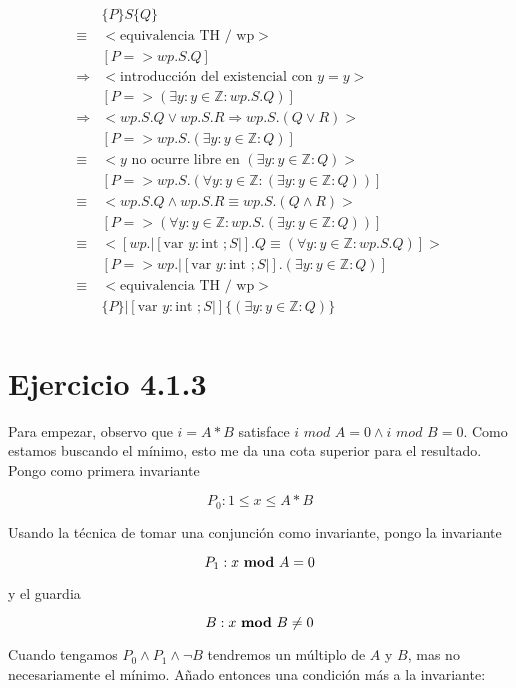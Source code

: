 \documentclass{article}
\begin{document}
\begin{align*}
 & \{P\} S \{Q\} \\
 \equiv & <\text{equivalencia TH / wp}> \\
 & [P => wp.S.Q] \\
 \Rightarrow & <\text{introducción del existencial con } y=y> \\
 & [P => (\exists y : y \in \mathbb{Z} : wp.S.Q)] \\
 \Rightarrow & <wp.S.Q \vee wp.S.R \Rightarrow wp.S.(Q \vee R)> \\
 & [P => wp.S.(\exists y : y \in \mathbb{Z} : Q)] \\
 \equiv & <y \text{ no ocurre libre en } (\exists y : y \in \mathbb{Z} : Q)> \\
 & [P => wp.S.(\forall y : y \in \mathbb{Z} : (\exists y : y \in \mathbb{Z} : Q))] \\
 \equiv & <wp.S.Q \wedge wp.S.R \equiv wp.S.(Q \wedge R)> \\
 & [P => (\forall y : y \in \mathbb{Z} : wp.S.(\exists y : y \in \mathbb{Z} : Q))] \\
 \equiv & <[wp.|[\text{var } y : \text{int } ; S |].Q \equiv (\forall y : y \in \mathbb{Z} : wp.S.Q)]> \\
 & [P => wp.|[\text{var } y : \text{int } ; S |].(\exists y : y \in \mathbb{Z} : Q)] \\
 \equiv & <\text{equivalencia TH / wp}> \\
 & \{P\} |[\text{var } y : \text{int } ; S |] \{(\exists y : y \in \mathbb{Z} : Q)\} \\
\end{align*}

\section{Ejercicio 4.1.3}

Para empezar, observo que $i = A*B$ satisface $i$ $mod$ $A = 0 \wedge i$ $mod$ $B = 0$.
Como estamos buscando el mínimo, esto me da una cota superior para el resultado.
Pongo como primera invariante

$$
P_0: 1 \leq x \leq A*B
$$

Usando la técnica de tomar una conjunción como invariante, pongo la invariante

$$
P_1: x \text{ {\bf mod} } A = 0
$$

y el guardia

$$
B: x \text{ {\bf mod} } B \neq 0
$$

Cuando tengamos $P_0 \wedge P_1 \wedge \neg B$ tendremos un múltiplo de $A$ y $B$, mas
no necesariamente el mínimo. Añado entonces una condición más a la invariante:
\end{document}

